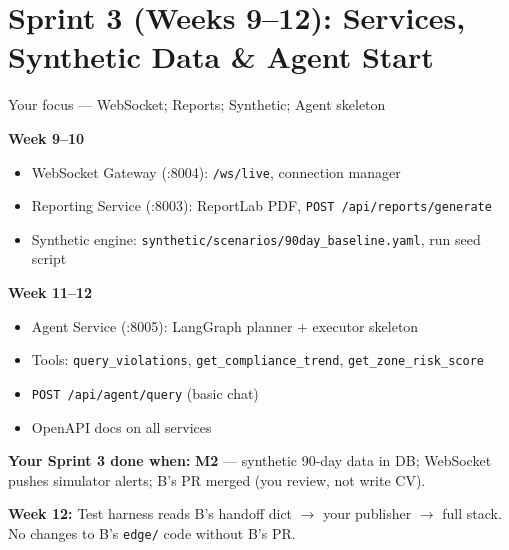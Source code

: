 \documentclass[12pt,a4paper]{article}
\begin{document}
\section{Sprint 3 (Weeks 9--12): Services, Synthetic Data \& Agent Start}

\begin{sprintbox}{{Your focus --- WebSocket; Reports; Synthetic; Agent skeleton}}

\begin{taskbox}
\textbf{Week 9--10}
\begin{itemize}
    \item WebSocket Gateway (:8004): \texttt{/ws/live}, connection manager
    \item Reporting Service (:8003): ReportLab PDF, \texttt{POST /api/reports/generate}
    \item Synthetic engine: \texttt{synthetic/scenarios/90day\_baseline.yaml}, run seed script
\end{itemize}
\end{taskbox}

\begin{taskbox}
\textbf{Week 11--12}
\begin{itemize}
    \item Agent Service (:8005): LangGraph planner + executor skeleton
    \item Tools: \texttt{query\_violations}, \texttt{get\_compliance\_trend}, \texttt{get\_zone\_risk\_score}
    \item \texttt{POST /api/agent/query} (basic chat)
    \item OpenAPI docs on all services
\end{itemize}
\end{taskbox}

\begin{deliverablebox}
\textbf{Your Sprint 3 done when:} \textbf{M2} --- synthetic 90-day data in DB; WebSocket pushes simulator alerts; B's PR merged (you review, not write CV).
\end{deliverablebox}

\begin{collabbox}
\textbf{Week 12:} Test harness reads B's handoff dict $\rightarrow$ your publisher $\rightarrow$ full stack. No changes to B's \texttt{edge/} code without B's PR.
\end{collabbox}

\end{sprintbox}
\end{document}
